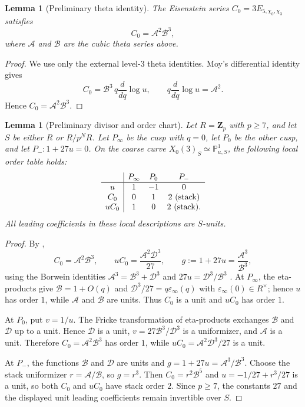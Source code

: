\documentclass[11pt]{amsart}
\newtheorem{lemma}[theorem]{Lemma}
\theoremstyle{definition}
\theoremstyle{remark}
\newcommand{\Z}{\mathbf{Z}}
\begin{document}
\begin{lemma}[Preliminary theta identity]\label{lem:prelim-theta}
The Eisenstein series $C_0=3E_{5,\chi_0,\chi_3}$ satisfies
\[
C_0=\mathcal A^2\mathcal B^3,
\]
where $\mathcal A$ and $\mathcal B$ are the cubic theta series above.
\end{lemma}

\begin{proof}
We use only the external level-$3$ theta identities. Moy's differential identity \cite{Moy} gives
\[
C_0=\mathcal B^3\,q\frac{d}{dq}\log u,
\qquad
q\frac{d}{dq}\log u=\mathcal A^2.
\]
Hence $C_0=\mathcal A^2\mathcal B^3$.
\end{proof}

\begin{lemma}[Preliminary divisor and order chart]\label{lem:prelim-divisor-chart}
Let $R=\Z_p$ with $p\ge7$, and let $S$ be either $R$ or $R/p^N R$. Let $P_\infty$ be the cusp with $q=0$, let $P_0$ be the other cusp, and let $P_-:1+27u=0$. On the coarse curve $X_0(3)_S\simeq\mathbb P^1_{u,S}$, the following local order table holds:
\[
\begin{array}{c|ccc}
& P_\infty & P_0 & P_- \\ \hline
u & 1 & -1 & 0\\
C_0 & 0 & 1 & 2\ \text{\rm(stack)}\\
uC_0 & 1 & 0 & 2\ \text{\rm(stack)}.
\end{array}
\]
All leading coefficients in these local descriptions are $S$-units.
\end{lemma}

\begin{proof}
By ,
\[
C_0=\mathcal A^2\mathcal B^3,
\qquad
uC_0=\frac{\mathcal A^2\mathcal D^3}{27},
\qquad
g:=1+27u=\frac{\mathcal A^3}{\mathcal B^3},
\]
using the Borwein identities $\mathcal A^3=\mathcal B^3+\mathcal D^3$ and $27u=\mathcal D^3/\mathcal B^3$ \cite{BBG}. At $P_\infty$, the eta-products give $\mathcal B=1+O(q)$ and $\mathcal D^3/27=q\varepsilon_\infty(q)$ with $\varepsilon_\infty(0)\in R^\times$; hence $u$ has order $1$, while $\mathcal A$ and $\mathcal B$ are units. Thus $C_0$ is a unit and $uC_0$ has order $1$.

At $P_0$, put $v=1/u$. The Fricke transformation of eta-products exchanges $\mathcal B$ and $\mathcal D$ up to a unit. Hence $\mathcal D$ is a unit, $v=27\mathcal B^3/\mathcal D^3$ is a uniformizer, and $\mathcal A$ is a unit. Therefore $C_0=\mathcal A^2\mathcal B^3$ has order $1$, while $uC_0=\mathcal A^2\mathcal D^3/27$ is a unit.

At $P_-$, the functions $\mathcal B$ and $\mathcal D$ are units and $g=1+27u=\mathcal A^3/\mathcal B^3$. Choose the stack uniformizer $r=\mathcal A/\mathcal B$, so $g=r^3$. Then $C_0=r^2\mathcal B^5$ and $u=-1/27+r^3/27$ is a unit, so both $C_0$ and $uC_0$ have stack order $2$. Since $p\ge7$, the constants $27$ and the displayed unit leading coefficients remain invertible over $S$.
\end{proof}
\end{document}
